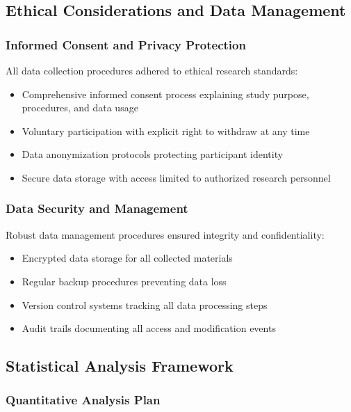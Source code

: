 \subsection{Ethical Considerations and Data Management}

\subsubsection{Informed Consent and Privacy Protection}

All data collection procedures adhered to ethical research standards:
\begin{itemize}
    \item Comprehensive informed consent process explaining study purpose, procedures, and data usage
    \item Voluntary participation with explicit right to withdraw at any time
    \item Data anonymization protocols protecting participant identity
    \item Secure data storage with access limited to authorized research personnel
\end{itemize}

\subsubsection{Data Security and Management}

Robust data management procedures ensured integrity and confidentiality:
\begin{itemize}
    \item Encrypted data storage for all collected materials
    \item Regular backup procedures preventing data loss
    \item Version control systems tracking all data processing steps
    \item Audit trails documenting all access and modification events
\end{itemize}

\subsection{Statistical Analysis Framework}

\subsubsection{Quantitative Analysis Plan}

